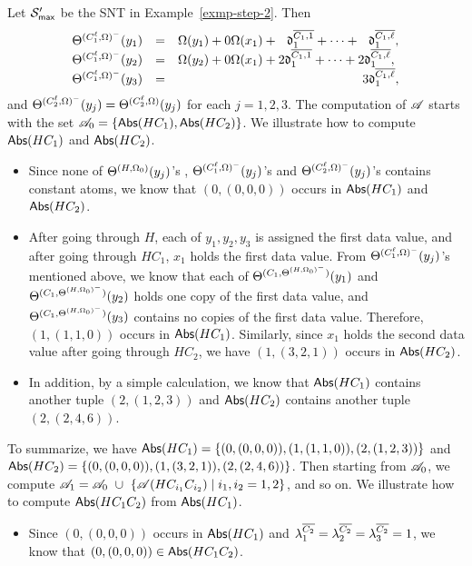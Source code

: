 \begin{example}\label{exmp-step-3}
Let ${\mathcal{S} }'_{\sf max}$ be the SNT in Example~\ref{exmp-step-2}. Then
\[
\begin{array}{l c l}
\sumf^{(C^\ell_1, \initval)^{-}}(y_1) &= & \initval(y_1) + 0 \initval(x_1) +\ \ \vard^{\circled{C_1, 1}}_1 + \dots +\ \ \vard^{\circled{C_1, \ell}}_1,\\
%
\sumf^{(C^\ell_1, \initval)^-}(y_2) &=& \initval(y_2) + 0 \initval(x_1) + 2 \vard^{\circled{C_1, 1}}_1 + \dots + 2 \vard^{\circled{C_1, \ell}}_1,\\
%
\sumf^{(C^\ell_1, \initval)^-}(y_3) &=& \hspace{5.1cm} 3 \vard^{\circled{C_1, \ell}}_1,
\end{array}
\] 
and $\Theta^{(C^\ell_2, \Omega)^-}(y_j) = \Theta^{(C^\ell_2, \Omega)}(y_j)$ for each $j=1,2,3$.
The computation of $\mathscr{A}$ starts with the set $\mathscr{A}_0 = \{\mathsf{Abs}(HC_1), \mathsf{Abs}(HC_2)\}$. We illustrate how to compute $\mathsf{Abs}(HC_1)$ and $\mathsf{Abs}(HC_2)$. 
\begin{itemize}
\item Since none of $\Theta^{(H, \Omega_0)}(y_j)$'s , $\Theta^{(C^\ell_1, \Omega)^{-}}(y_j)$'s and $\Theta^{(C^\ell_2, \Omega)^{-}}(y_j)$'s contains constant atoms, we know that $(0, (0,0,0))$ occurs in $\mathsf{Abs}(HC_1)$ and  $\mathsf{Abs}(HC_2)$. 
%
\item After going through $H$, each of $y_1,y_2,y_3$ is assigned the first data value, and after going through $HC_1$, $x_1$ holds the first data value. From $\Theta^{(C^\ell_1, \Omega)^{-}}(y_j)$'s mentioned above, we know that each of $\Theta^{(C_1, \Theta^{(H, \Omega_0)^{-}})}(y_1)$ and $\Theta^{(C_1, \Theta^{(H, \Omega_0)^{-}})}(y_2)$ holds one copy of the first data value,  and $\Theta^{(C_1, \Theta^{(H, \Omega_0)^{-}})}(y_3)$ contains no copies of the first data value. Therefore, $(1, (1,1,0))$ occurs in $\mathsf{Abs}(HC_1)$. Similarly, since $x_1$ holds the second data value after going through $HC_2$, we have $(1, (3, 2, 1))$ occurs in $\mathsf{Abs}(HC_2)$. 
%
\item In addition, by a simple calculation, we know that $\mathsf{Abs}(HC_1)$ contains another tuple $(2,(1, 2, 3))$ and $\mathsf{Abs}(HC_2)$ contains another tuple $(2, (2, 4, 6))$.
\end{itemize}
To summarize, we have $\mathsf{Abs}(HC_1)=\{(0, (0,0,0)), (1, (1, 1, 0)), (2, (1, 2, 3))\}$ and $\mathsf{Abs}(HC_2) = \{(0, (0, 0, 0)), (1, (3, 2,1)), (2, (2, 4, 6))\}$. Then starting from $\mathscr{A}_0$, we compute $\mathscr{A}_1 = \mathscr{A}_0\ \cup\ \{\mathscr{A}(HC_{i_1}C_{i_2}) \mid i_1, i_2 = 1, 2\}$, and so on. We illustrate how to compute $\mathsf{Abs}(HC_1 C_2)$ from $\mathsf{Abs}(HC_1)$. 
\begin{itemize}
\item Since $(0, (0,0,0))$ occurs in $\mathsf{Abs}(HC_1)$ and $\lambda^{\overline{C_2}}_1 = \lambda^{\overline{C_2}}_2 = \lambda^{\overline{C_2}}_3 = 1$, we know that $(0, (0,0,0)) \in \mathsf{Abs}(HC_1C_2)$.


\end{itemize}
\end{example}
